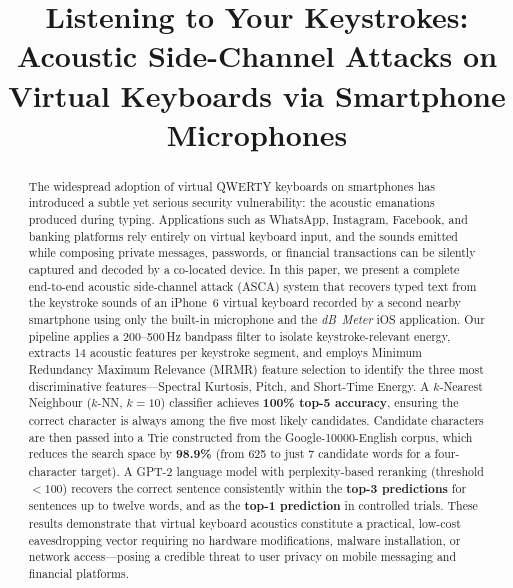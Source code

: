 \documentclass[conference]{IEEEtran}
\begin{document}
\title{Listening to Your Keystrokes: Acoustic Side-Channel Attacks on Virtual Keyboards via Smartphone Microphones}

\author{
}

\maketitle

\begin{abstract}
The widespread adoption of virtual QWERTY keyboards on smartphones has introduced a subtle yet serious security vulnerability: the acoustic emanations produced during typing. Applications such as WhatsApp, Instagram, Facebook, and banking platforms rely entirely on virtual keyboard input, and the sounds emitted while composing private messages, passwords, or financial transactions can be silently captured and decoded by a co-located device. In this paper, we present a complete end-to-end acoustic side-channel attack (ASCA) system that recovers typed text from the keystroke sounds of an iPhone~6 virtual keyboard recorded by a second nearby smartphone using only the built-in microphone and the \textit{dB~Meter} iOS application. Our pipeline applies a 200--500\,Hz bandpass filter to isolate keystroke-relevant energy, extracts 14 acoustic features per keystroke segment, and employs Minimum Redundancy Maximum Relevance (MRMR) feature selection to identify the three most discriminative features---Spectral Kurtosis, Pitch, and Short-Time Energy. A $k$-Nearest Neighbour ($k$-NN, $k{=}10$) classifier achieves \textbf{100\% top-5 accuracy}, ensuring the correct character is always among the five most likely candidates. Candidate characters are then passed into a Trie constructed from the Google-10000-English corpus, which reduces the search space by \textbf{98.9\%} (from 625 to just 7 candidate words for a four-character target). A GPT-2 language model with perplexity-based reranking (threshold $< 100$) recovers the correct sentence consistently within the \textbf{top-3 predictions} for sentences up to twelve words, and as the \textbf{top-1 prediction} in controlled trials. These results demonstrate that virtual keyboard acoustics constitute a practical, low-cost eavesdropping vector requiring no hardware modifications, malware installation, or network access---posing a credible threat to user privacy on mobile messaging and financial platforms.
\end{abstract}
\end{document}
